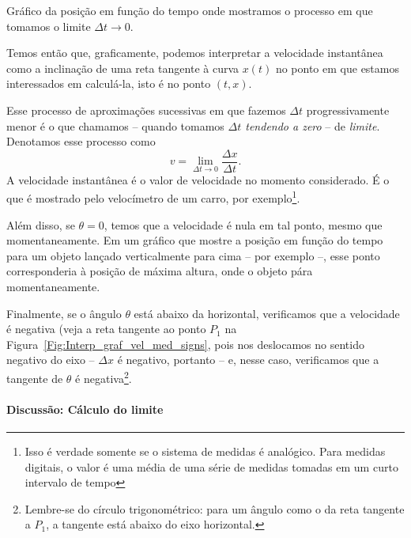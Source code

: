 \begin{marginfigure}
\caption{Gráfico da posição em função do tempo onde mostramos o processo em que tomamos o limite $\Delta t \to 0$.\label{Fig:Interp_graf_vel_med_lim}}
\end{marginfigure}

Temos então que, graficamente, podemos interpretar a velocidade instantânea como a inclinação de uma reta tangente à curva $x(t)$ no ponto em que estamos interessados em calculá-la, isto é no ponto $(t,x)$.

Esse processo de aproximações sucessivas em que fazemos $\Delta t$ progressivamente menor é o que chamamos -- quando tomamos \emph{$\Delta t$ tendendo a zero} -- de \emph{limite}. Denotamos esse processo como
\begin{equation}
  v = \lim_{\Delta t \to 0} \frac{\Delta x}{\Delta t}.
\end{equation}
%
A velocidade instantânea é o valor de velocidade no momento considerado. É o que é mostrado pelo velocímetro de um carro, por exemplo\footnote{Isso é verdade somente se o sistema de medidas é analógico. Para medidas digitais, o valor é uma média de uma série de medidas tomadas em um curto intervalo de tempo}.

Além disso, se $\theta=0$, temos que a velocidade é nula em tal ponto, mesmo que momentaneamente. Em um gráfico que mostre a posição em função do tempo para um objeto lançado verticalmente para cima -- por exemplo --, esse ponto corresponderia à posição de máxima altura, onde o objeto pára momentaneamente.

Finalmente, se o ângulo $\theta$ está abaixo da horizontal, verificamos que a velocidade é negativa (veja a reta tangente ao ponto $P_1$ na Figura~\ref{Fig:Interp_graf_vel_med_signs}, pois nos deslocamos no sentido negativo do eixo -- $\Delta x$ é negativo, portanto -- e, nesse caso, verificamos que a tangente de $\theta$ é negativa\footnote{Lembre-se do círculo trigonométrico: para um ângulo como o da reta tangente a $P_1$, a tangente está abaixo do eixo horizontal.}.

\paragraph{Discussão: Cálculo do limite}

